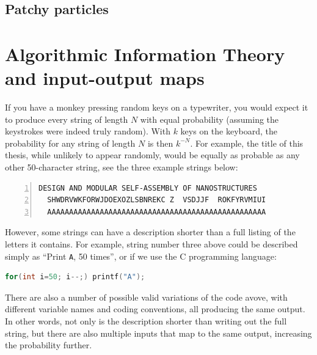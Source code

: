 \subsection{Patchy particles}

\section{Algorithmic Information Theory and input-output maps}




If you have a monkey pressing random keys on a typewriter, you would expect it to produce every string of length \(N\) with equal probability (assuming the keystrokes were indeed truly random). With \(k\) keys on the keyboard, the probability for any string of length \(N\) is then \(k^{-N}\). For example, the title of this thesis, while unlikely to appear randomly, would be equally as probable as any other 50-character string, see the three example strings below:
\begin{lstlisting}[numbers=left]
  DESIGN AND MODULAR SELF-ASSEMBLY OF NANOSTRUCTURES
  SHWDRVWKFORWJDOEXOZLSBNREKC Z  VSDJJF  ROKFYRVMIUI
  AAAAAAAAAAAAAAAAAAAAAAAAAAAAAAAAAAAAAAAAAAAAAAAAAA
\end{lstlisting}

However, some strings can have a description shorter than a full listing of the letters it contains. For example, string number three above could be described simply as ``Print \texttt{A}, 50 times'', or if we use the C programming language:

\begin{lstlisting}[language=c]
for(int i=50; i--;) printf("A");
\end{lstlisting}

There are also a number of possible valid variations of the code avove, with different variable names and coding conventions, all producing the same output. In other words, not only is the description shorter than writing out the full string, but there are also multiple inputs that map to the same output, increasing the probability further.

